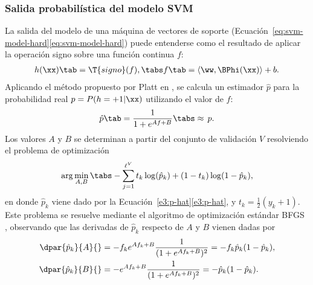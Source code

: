 %
\subsubsection{Salida probabilística del modelo SVM}
%
La salida del modelo de una máquina de vectores de soporte
(\iflatexml{}Ecuación~\ref{eq:svm-model-hard}\else\autoref{eq:svm-model-hard}\fi)
puede entenderse como el resultado de aplicar la operación signo sobre
una función continua $f$:
%
\begin{align}
\label{e3:svm-model-as-sign-f}
  h(\xx) \tab= \T{signo}(f),\tabs
  f\tab=\langle\ww,\BPhi(\xx)\rangle+b.
\end{align}
%
Aplicando el método propuesto por {Platt} en \cite{platt}, se calcula
un estimador $\hat{p}$ para la probabilidad real $p=P(h=+1|\xx)$
utilizando el valor de $f$:
%
\begin{align}
\label{e3:p-hat}
  \hat{p}\tab=\frac{1}{1+e^{Af+B}} \tabs\approx\,{}p.%
\end{align}
%
Los valores $A$ y $B$ se determinan a partir del conjunto de validación
$V$ resolviendo el problema de optimización
%
\begin{align}
  \arg\min_{A,B} \tabs -\sum_{j=1}^{\ell^V} t_k\log(\hat{p}_k)+(1-t_k)\log(1-\hat{p}_k),
  \label{abproblem}
\end{align}
%
en donde $\hat{p}_k$ viene dado por la
\iflatexml{}Ecuación~\ref{e3:p-hat}\else\autoref{e3:p-hat}\fi{}, y
$t_k=\frac{1}{2}({y_k+1})$.
Este problema se resuelve mediante el algoritmo de optimización
estándar BFGS \cite{nocedal}, observando que las derivadas de
$\hat{p}_k$ respecto de $A$ y $B$ vienen dadas por
%
\begin{align}
  \begin{split}
    \dpar{\hat{p}_k}{A}{}&=-f_k e^{Af_k+B}\frac{1}{(1+e^{Af_k+B})^2}
    =-f_k\hat{p}_k(1-\hat{p}_k),\\
    \dpar{\hat{p}_k}{B}{}&=    -e^{Af_k+B}\frac{1}{(1+e^{Af_k+B})^2}
    =-   \hat{p}_k(1-\hat{p}_k).
  \end{split}
\label{e3:deriv-pk-wrt-AB}
\end{align}
%


